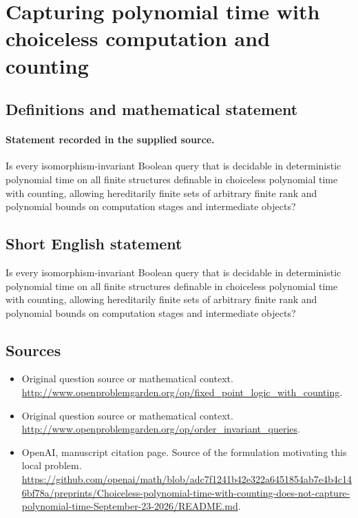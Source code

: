 \documentclass[11pt]{article}
\begin{document}
\section*{Capturing polynomial time with choiceless computation and counting}\label{30007203}
\subsection{Definitions and mathematical statement}
\paragraph{Statement recorded in the supplied source.}
Is every isomorphism-invariant Boolean query that is decidable in deterministic polynomial time on all finite structures definable in choiceless polynomial time with counting, allowing hereditarily finite sets of arbitrary finite rank and polynomial bounds on computation stages and intermediate objects?
\subsection{Short English statement}
Is every isomorphism-invariant Boolean query that is decidable in deterministic polynomial time on all finite structures definable in choiceless polynomial time with counting, allowing hereditarily finite sets of arbitrary finite rank and polynomial bounds on computation stages and intermediate objects?
\subsection{Sources}
\begin{itemize}
\item[S1] Original question source or mathematical context.
\url{http://www.openproblemgarden.org/op/fixed_point_logic_with_counting}.
\item[S2] Original question source or mathematical context.
\url{http://www.openproblemgarden.org/op/order_invariant_queries}.
\item[S3] OpenAI, manuscript citation page. Source of the formulation motivating this local problem.
\url{https://github.com/openai/math/blob/adc7f1241b42e322a6451854ab7e4b4c146bf78a/preprints/Choiceless-polynomial-time-with-counting-does-not-capture-polynomial-time-September-23-2026/README.md}.
\end{itemize}
\end{document}
